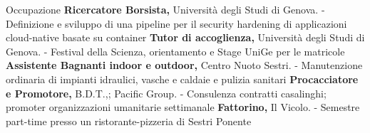 \begin{rubric}{Occupazione}
\entry*[07/2024 -- 10/2025]%
	\textbf{Ricercatore Borsista,} Università degli Studi di Genova.\newline
    - Definizione e sviluppo di una pipeline per il security hardening di applicazioni cloud-native basate su container 
%
\entry*[2023 -- 2024]%
	\textbf{Tutor di accoglienza,} Università degli Studi di Genova.\newline
    -  Festival della Scienza, orientamento e Stage UniGe per le matricole
%
\entry*[2018 -- 06/2024]%
	\textbf{Assistente Bagnanti indoor e outdoor,}  Centro Nuoto Sestri.\newline
    - Manutenzione ordinaria di impianti idraulici, vasche e caldaie e pulizia sanitari
%
%
\entry*[2020]%
	\textbf{Procacciatore e Promotore,} B.D.T.,; Pacific Group.\newline
    - Consulenza contratti casalinghi; promoter organizzazioni umanitarie settimanale
%
\entry*[2019 -- 2020]%
	\textbf{Fattorino,} Il Vicolo.\newline
    - Semestre part-time presso un ristorante-pizzeria di Sestri Ponente
%
\end{rubric}